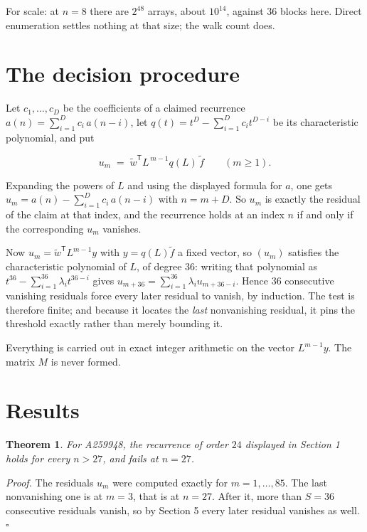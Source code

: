 \documentclass[11pt]{article}
\newtheorem{theorem}{Theorem}
\theoremstyle{definition}
\begin{document}
For scale: at $n = 8$ there are $2^{48}$ arrays, about $10^{14}$, against $36$ blocks here. Direct enumeration settles nothing at that size; the walk count does.

\section{The decision procedure}

Let $c_1,\dots,c_D$ be the coefficients of a claimed recurrence $a(n) = \sum_{i=1}^{D} c_i\,a(n-i)$, let $q(t) = t^{D} - \sum_{i=1}^{D} c_i t^{D-i}$ be its characteristic polynomial, and put

\[u_m \;=\; \tilde w^{\mathsf T} L^{\,m-1} q(L)\,\tilde f \qquad (m \ge 1).\]

Expanding the powers of $L$ and using the displayed formula for $a$, one gets $u_m = a(n) - \sum_{i=1}^{D} c_i\,a(n-i)$ with $n = m + D$. So $u_m$ is exactly the residual of the claim at that index, and the recurrence holds at an index $n$ if and only if the corresponding $u_m$ vanishes.

Now $u_m = \tilde w^{\mathsf T} L^{m-1} y$ with $y = q(L)\tilde f$ a fixed vector, so $(u_m)$ satisfies the characteristic polynomial of $L$, of degree $36$: writing that polynomial as $t^{36} - \sum_{i=1}^{36} \lambda_i t^{36-i}$ gives $u_{m+36} = \sum_{i=1}^{36} \lambda_i u_{m+36-i}$. Hence $36$ consecutive vanishing residuals force every later residual to vanish, by induction. The test is therefore finite; and because it locates the {\itshape last} nonvanishing residual, it pins the threshold exactly rather than merely bounding it.

Everything is carried out in exact integer arithmetic on the vector $L^{m-1}y$. The matrix $M$ is never formed.

\section{Results}

\begin{theorem} For A259948, the recurrence of order $24$ displayed in Section 1 holds for every $n > 27$, and fails at $n = 27$.\end{theorem}

{\itshape Proof.} The residuals $u_m$ were computed exactly for $m = 1,\dots,85$. The last nonvanishing one is at $m = 3$, that is at $n = 27$. After it, more than $S = 36$ consecutive residuals vanish, so by Section 5 every later residual vanishes as well. $\square$
\end{document}
